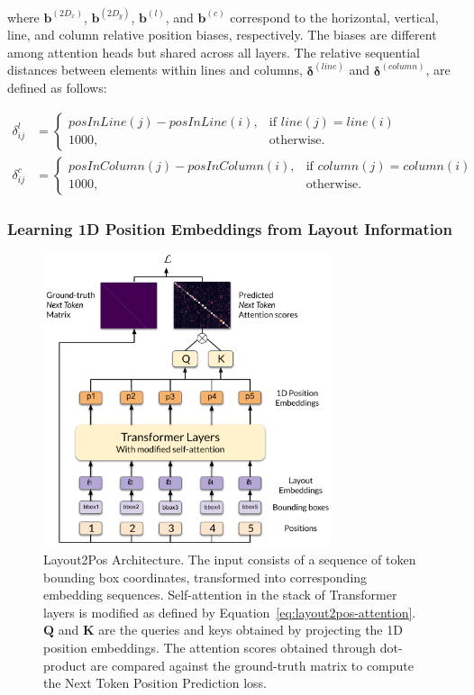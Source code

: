 \noindent where $\bm{b}^{(2D_x)}$, $\bm{b}^{(2D_y)}$, $\bm{b}^{(l)}$, and $\bm{b}^{(c)}$ correspond to the horizontal, vertical, line, and column relative position biases, respectively. The biases are different among attention heads but shared across all layers. The relative sequential distances between elements within lines and columns, $\bm{\delta}^{(line)}$ and $\bm{\delta}^{(column)}$, are defined as follows:

\begin{equation}
  \begin{split}
    \delta^{l}_{ij} &= 
        \begin{cases}
          posInLine(j) - posInLine(i), & \text{if } line(j) = line(i)\\
            1000,              & \text{otherwise}.
        \end{cases} \\
    \delta^{c}_{ij} &= 
      \begin{cases}
        posInColumn(j) - posInColumn(i), & \text{if } column(j) = column(i)\\
          1000,              & \text{otherwise}.
      \end{cases}
  \end{split}
\end{equation}

\subsubsection{Learning 1D Position Embeddings from Layout Information}

\begin{figure}
  \centering
  \includegraphics[width=0.75\textwidth]{images/chapter4/Layout2Pos.pdf}
  \caption{Layout2Pos Architecture. The input consists of a sequence of token bounding box coordinates, transformed into corresponding embedding sequences. Self-attention in the stack of Transformer layers is modified as defined by Equation~\ref{eq:layout2pos-attention}. $\bm{Q}$ and $\bm{K}$ are the queries and keys obtained by projecting the 1D position embeddings. The attention scores obtained through dot-product are compared against the ground-truth matrix to compute the Next Token Position Prediction loss.}
  \label{fig:layout2pos-module}
\end{figure}

